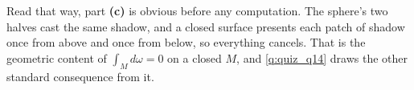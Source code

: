 \begin{exercisesolution}
\begin{remark}
Read that way, part \textbf{(c)} is obvious before any computation. The sphere's two halves cast
the same shadow, and a closed surface presents each patch of shadow once from above and once from
below, so everything cancels. That is the geometric content of $\int_M d\omega = 0$ on a closed
$M$, and \cref{q:quiz_q14} draws the other standard consequence from it.
\end{remark}
\end{exercisesolution}
